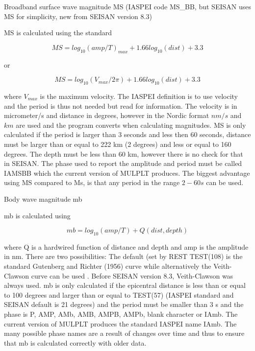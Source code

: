 Broadband surface wave magnitude MS (IASPEI code MS\_BB, but SEISAN uses MS 
for simplicity, new from SEISAN version 8.3)

MS is calculated using the standard

\begin{displaymath}
   MS = log_{10}(amp/T)_{max}+1.66log_{10}(dist)+3.3
\end{displaymath}
 
or

\begin{displaymath}
   MS = log_{10}(V_{max}/2 \pi )+1.66log_{10}(dist)+3.3
\end{displaymath}


where $V_{max}$ is the maximum velocity.  The IASPEI definition is 
to use velocity and the period is thus not needed but read for information. 
The velocity is in micrometer/s and distance in degrees, however in 
the Nordic format $nm/s$ and $km$ are used and the program converts when 
calculating magnitudes. MS is only calculated if the period is larger 
than 3 seconds  and less then 60 seconds, distance must be larger 
than or equal to 222 km (2 degrees) and less or equal to 160 degrees. 
The depth must be less than 60 km, however there is no check for that 
in SEISAN. The phase used to report the amplitude and period must be 
called IAMSBB which the current version of MULPLT produces. The biggest 
advantage using MS compared to Ms, is that any period in the range 
$2-60 s$ can be used.


Body wave magnitude mb

mb is calculated using 

\begin{displaymath}
mb = log_{10}(amp/T) + Q(dist,depth)
\end{displaymath}

where Q is a hardwired function of distance and depth and amp is the 
amplitude in nm. There are two possibilities: The default (set by 
REST TEST(108) is the standard Gutenberg and Richter (1956) curve 
while alternatively the Veith-Clawson curve can be used \citep{veith1972}. 
Before SEISAN version 8.3, Veith-Clawson was always used. mb is only 
calculated if the epicentral distance is less than or equal to 100 
degrees and larger than or equal to TEST(57) (IASPEI standard and 
SEISAN default is 21 degrees) and the period must be smaller than 
3 s and  the phase is P, AMP,  AMb, AMB, AMPB, AMPb, blank character 
or IAmb. The current version of MULPLT produces the standard IASPEI 
name IAmb. The many possible phase names are a result of changes over 
time and thus to ensure that mb is calculated correctly with older data.


